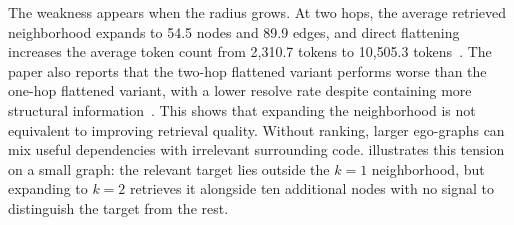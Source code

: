 The weakness appears when the radius grows. At two hops, the average retrieved neighborhood expands to 54.5 nodes and 89.9 edges, and direct flattening increases the average token count from 2{,}310.7 tokens to 10{,}505.3 tokens~\cite{ouyang2025repograph}. The paper also reports that the two-hop flattened variant performs worse than the one-hop flattened variant, with a lower resolve rate despite containing more structural information~\cite{ouyang2025repograph}. This shows that expanding the neighborhood is not equivalent to improving retrieval quality. Without ranking, larger ego-graphs can mix useful dependencies with irrelevant surrounding code.  illustrates this tension on a small graph: the relevant target lies outside the $k{=}1$ neighborhood, but expanding to $k{=}2$ retrieves it alongside ten additional nodes with no signal to distinguish the target from the rest.

